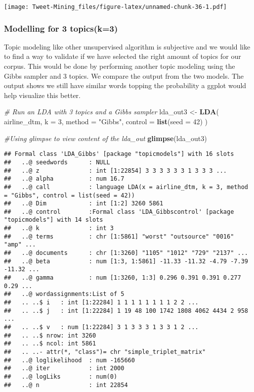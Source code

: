 \documentclass[
]{article}
\newenvironment{Shaded}{\begin{snugshade}}{\end{snugshade}}
\newcommand{\CommentTok}[1]{\textcolor[rgb]{0.56,0.35,0.01}{\textit{#1}}}
\newcommand{\DataTypeTok}[1]{\textcolor[rgb]{0.13,0.29,0.53}{#1}}
\newcommand{\DecValTok}[1]{\textcolor[rgb]{0.00,0.00,0.81}{#1}}
\newcommand{\KeywordTok}[1]{\textcolor[rgb]{0.13,0.29,0.53}{\textbf{#1}}}
\newcommand{\NormalTok}[1]{#1}
\newcommand{\StringTok}[1]{\textcolor[rgb]{0.31,0.60,0.02}{#1}}
\begin{document}
\texttt{[image: Tweet-Mining\_files/figure-latex/unnamed-chunk-36-1.pdf]}

\hypertarget{modelling-for-3-topicsk3}{%
\subsubsection{Modelling for 3
topics(k=3)}\label{modelling-for-3-topicsk3}}

Topic modeling like other unsupervised algorithm is subjective and we
would like to find a way to validate if we have selected the right
amount of topics for our corpus. This would be done by performing
another topic modeling using the Gibbs sampler and 3 topics. We compare
the output from the two models. The output shows we still have similar
words topping the probability a ggplot would help visualize this better.

\begin{Shaded}
\begin{Highlighting}[]
\CommentTok{# Run an LDA with 3 topics and a Gibbs sampler}
\NormalTok{lda_out3 <-}\StringTok{ }\KeywordTok{LDA}\NormalTok{(}
\NormalTok{  airline_dtm,}
  \DataTypeTok{k =} \DecValTok{3}\NormalTok{,}
  \DataTypeTok{method =} \StringTok{"Gibbs"}\NormalTok{,}
  \DataTypeTok{control =} \KeywordTok{list}\NormalTok{(}\DataTypeTok{seed =} \DecValTok{42}\NormalTok{)}
\NormalTok{)}

\CommentTok{#Using glimpse to view content of the lda_out}
\KeywordTok{glimpse}\NormalTok{(lda_out3)}
\end{Highlighting}
\end{Shaded}

\begin{verbatim}
## Formal class 'LDA_Gibbs' [package "topicmodels"] with 16 slots
##   ..@ seedwords      : NULL
##   ..@ z              : int [1:22854] 3 3 3 3 3 3 1 3 3 3 ...
##   ..@ alpha          : num 16.7
##   ..@ call           : language LDA(x = airline_dtm, k = 3, method = "Gibbs", control = list(seed = 42))
##   ..@ Dim            : int [1:2] 3260 5861
##   ..@ control        :Formal class 'LDA_Gibbscontrol' [package "topicmodels"] with 14 slots
##   ..@ k              : int 3
##   ..@ terms          : chr [1:5861] "worst" "outsource" "0016" "amp" ...
##   ..@ documents      : chr [1:3260] "1105" "1012" "729" "2137" ...
##   ..@ beta           : num [1:3, 1:5861] -11.33 -11.32 -4.79 -7.39 -11.32 ...
##   ..@ gamma          : num [1:3260, 1:3] 0.296 0.391 0.391 0.277 0.29 ...
##   ..@ wordassignments:List of 5
##   .. ..$ i   : int [1:22284] 1 1 1 1 1 1 1 1 2 2 ...
##   .. ..$ j   : int [1:22284] 1 19 48 100 1742 1808 4062 4434 2 958 ...
##   .. ..$ v   : num [1:22284] 3 1 3 3 3 1 3 3 1 2 ...
##   .. ..$ nrow: int 3260
##   .. ..$ ncol: int 5861
##   .. ..- attr(*, "class")= chr "simple_triplet_matrix"
##   ..@ loglikelihood  : num -165660
##   ..@ iter           : int 2000
##   ..@ logLiks        : num(0) 
##   ..@ n              : int 22854
\end{verbatim}
\end{document}
